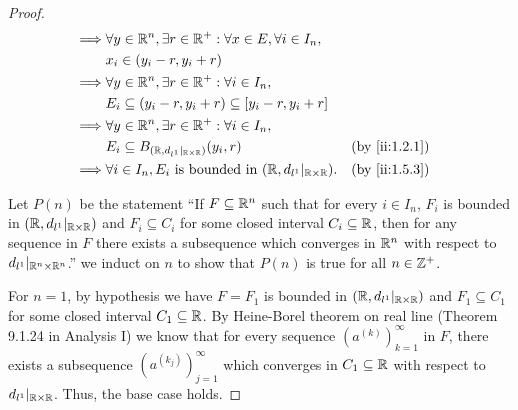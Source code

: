 \begin{proof}
\begin{align*}
    \implies & \forall y \in \R^n, \exists r \in \R^+ : \forall x \in E, \forall i \in I_n,                                                     \\
             & x_i \in (y_i - r, y_i + r)                                                                                                       \\
    \implies & \forall y \in \R^n, \exists r \in \R^+ : \forall i \in I_n,                                                                      \\
             & E_i \subseteq (y_i - r, y_i + r) \subseteq [y_i - r, y_i + r]                                                                    \\
    \implies & \forall y \in \R^n, \exists r \in \R^+ : \forall i \in I_n,                                                                      \\
             & E_i \subseteq B_{(\R, d_{l^1}|_{\R \times \R})}(y_i, r)                                                       &  & \by{ii:1.2.1} \\
    \implies & \forall i \in I_n, E_i \text{ is bounded in } (\R, d_{l^1}|_{\R \times \R}).                                  &  & \by{ii:1.5.3}
  \end{align*}

  Let \(P(n)\) be the statement ``If \(F \subseteq \mathbb{R}^n\) such that for every \(i \in I_n\), \(F_i\) is bounded in \((\mathbb{R}, d_{l^1}|_{\mathbb{R} \times \mathbb{R}})\) and \(F_i \subseteq C_i\) for some closed interval \(C_i \subseteq \mathbb{R}\), then for any sequence in \(F\) there exists a subsequence which converges in \(\mathbb{R}^n\) with respect to \(d_{l^1}|_{\mathbb{R}^n \times \mathbb{R}^n}\).''
  we induct on \(n\) to show that \(P(n)\) is true for all \(n \in \mathbb{Z}^+\).

  For \(n = 1\), by hypothesis we have \(F = F_1\) is bounded in \((\mathbb{R}, d_{l^1}|_{\mathbb{R} \times \mathbb{R}})\) and \(F_1 \subseteq C_1\) for some closed interval \(C_1 \subseteq \mathbb{R}\).
  By Heine-Borel theorem on real line (Theorem 9.1.24 in Analysis I) we know that for every sequence \((a^{(k)})_{k = 1}^\infty\) in \(F\), there exists a subsequence \((a^{(k_j)})_{j = 1}^\infty\) which converges in \(C_1 \subseteq \mathbb{R}\) with respect to \(d_{l^1}|_{\mathbb{R} \times \mathbb{R}}\).
  Thus, the base case holds.


\end{proof}
